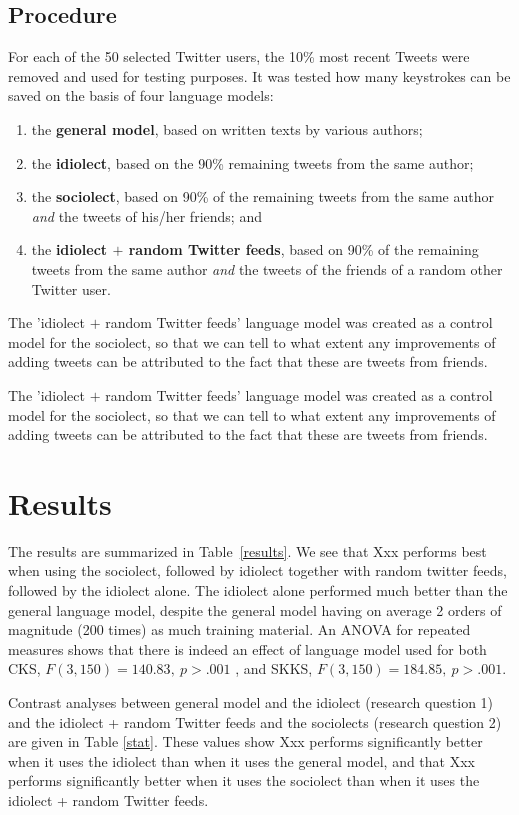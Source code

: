 \documentclass[11pt]{article}
\begin{document}
\subsection{Procedure}
For each of the 50 selected Twitter users, the 10\% most recent Tweets were removed and used for testing purposes. It was tested how many keystrokes can be saved on the basis of four language models:

\begin{enumerate}
\item the \textbf{general model}, based on written texts by various authors;
\item the \textbf{idiolect}, based on the 90\% remaining tweets from the same author;
\item the \textbf{sociolect}, based on 90\% of the remaining tweets from the same author \emph{and} the tweets of his/her friends; and
\item the \textbf{idiolect $+$ random Twitter feeds}, based on 90\% of the remaining tweets from the same author \emph{and} the tweets of the friends of a random other Twitter user.
\end{enumerate}

The 'idiolect $+$ random Twitter feeds' language model was created as a control model for the sociolect, so that we can tell to what extent any improvements of adding tweets can be attributed to the fact that these are tweets from friends.

The 'idiolect $+$ random Twitter feeds' language model was created as a control model for the sociolect, so that we can tell to what extent any improvements of adding tweets can be attributed to the fact that these are tweets from friends.

\section{Results}

The results are summarized in Table~\ref{results}. We see that Xxx performs best when using the sociolect, followed by idiolect together with random twitter feeds, followed by the idiolect alone. The idiolect alone performed much better than the general language model, despite the general model having on average 2 orders of magnitude (200 times) as much training material. An ANOVA for repeated measures shows that there is indeed an effect of language model used for both CKS, $F(3,150) = 140.83,\ p > .001$ , and SKKS, $F(3,150) = 184.85,\ p > .001$. 

Contrast analyses between general model and the idiolect (research question 1) and the idiolect + random Twitter feeds and the sociolects (research question 2) are given in Table \ref{stat}. These values show Xxx performs significantly better when it uses the idiolect than when it uses the general model, and that Xxx performs significantly better when it uses the sociolect than when it uses the idiolect + random Twitter feeds.
\end{document}
